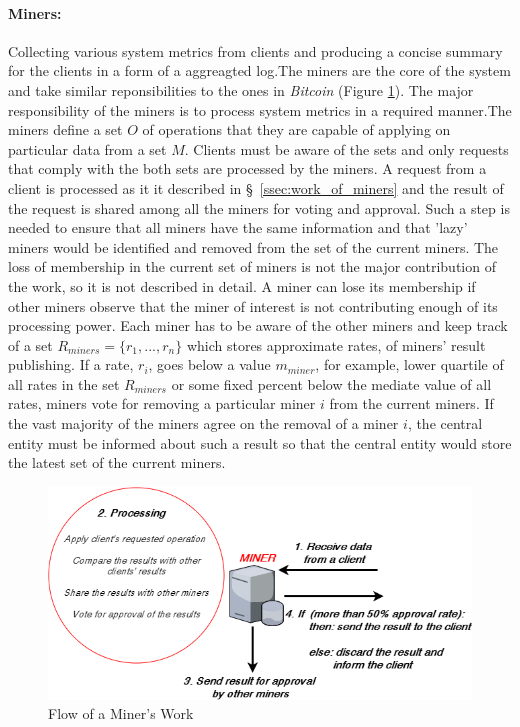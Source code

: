 \documentclass[11px]{article}
\begin{document}
\paragraph{Miners:} Collecting various system metrics from clients and producing a concise summary for the clients in a form of a aggreagted log.The miners are the core of the system and take similar reponsibilities to the ones in \textit{Bitcoin} (Figure \ref{fig:miner_work_flow}). The major responsibility of the miners is to process system metrics in a required manner.The miners define a set $O$ of operations that they are capable of applying on particular data from a set $M$. Clients must be aware of the sets and only requests that comply with the both sets are processed by the miners. A request from a client is processed as it it described in \S\ \ref{ssec:work_of_miners} and the result of the request is shared among all the miners for voting and approval. Such a step is needed to ensure that all miners have the same information and that 'lazy' miners would be identified and removed from the set of the current miners. The loss of membership in the current set of miners is not the major contribution of the work, so it is not described in detail. A miner can lose its membership if other miners observe that the miner of interest is not contributing enough of its processing power. Each miner has to be aware of the other miners and keep track of a set $R_{miners} = \{r_1, ..., r_n\}$ which stores approximate rates, of  miners' result publishing. If a rate, $r_i$, goes below a value $m_{miner}$,  for example, lower quartile of all rates in the set $R_{miners}$ or some fixed percent below the mediate value of all rates, miners vote for removing a particular miner $i$ from the current miners. If the vast majority of the miners agree on the removal of a miner $i$,  the central entity must be informed about such a result so that the central entity would store the latest set of the current miners.
\par


\begin{figure}[h]
  \begin{center}
    \includegraphics[width=0.8\linewidth]{figures/miner_work_diagram.png}
    \caption{Flow of a Miner's Work}
    \label{fig:miner_work_flow}
  \end{center}
\end{figure}
\end{document}
